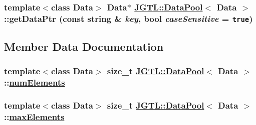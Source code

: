 \hypertarget{class_j_g_t_l_1_1_data_pool_324ce69513e59869e37f94c67285307f}{
\subsubsection[getDataPtr]{\setlength{\rightskip}{0pt plus 5cm}template$<$class Data$>$ Data$\ast$ \hyperlink{class_j_g_t_l_1_1_data_pool}{JGTL::Data\-Pool}$<$ Data $>$::get\-Data\-Ptr (const string \& {\em key}, bool {\em case\-Sensitive} = {\tt true})}}
\label{class_j_g_t_l_1_1_data_pool_324ce69513e59869e37f94c67285307f}




\subsection{Member Data Documentation}
\hypertarget{class_j_g_t_l_1_1_data_pool_9212d2d6361f7899c7466d283da57348}{
\subsubsection[numElements]{\setlength{\rightskip}{0pt plus 5cm}template$<$class Data$>$ size\_\-t \hyperlink{class_j_g_t_l_1_1_data_pool}{JGTL::Data\-Pool}$<$ Data $>$::\hyperlink{class_j_g_t_l_1_1_data_pool_9212d2d6361f7899c7466d283da57348}{num\-Elements}}}
\label{class_j_g_t_l_1_1_data_pool_9212d2d6361f7899c7466d283da57348}


\hypertarget{class_j_g_t_l_1_1_data_pool_719aa8582f73c25d5a8b2d99b965c108}{
\subsubsection[maxElements]{\setlength{\rightskip}{0pt plus 5cm}template$<$class Data$>$ size\_\-t \hyperlink{class_j_g_t_l_1_1_data_pool}{JGTL::Data\-Pool}$<$ Data $>$::\hyperlink{class_j_g_t_l_1_1_data_pool_719aa8582f73c25d5a8b2d99b965c108}{max\-Elements}}}
\label{class_j_g_t_l_1_1_data_pool_719aa8582f73c25d5a8b2d99b965c108}


